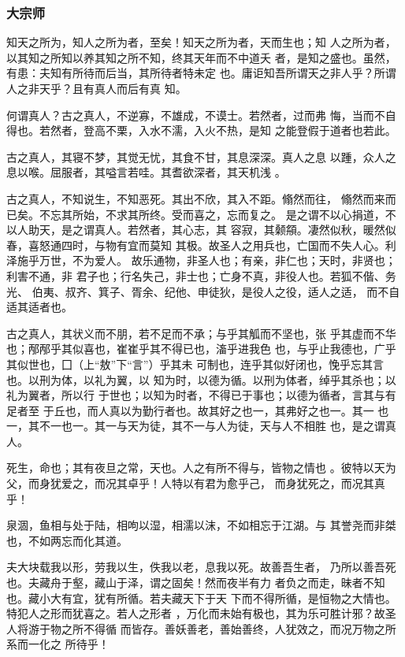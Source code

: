 \documentclass[]{article}
\begin{document}
\hypertarget{header-n2049}{%
\subsubsection{大宗师}\label{header-n2049}}

知天之所为，知人之所为者，至矣！知天之所为者，天而生也；知
人之所为者，以其知之所知以养其知之所不知，终其天年而不中道夭
者，是知之盛也。虽然，有患：夫知有所待而后当，其所待者特未定
也。庸讵知吾所谓天之非人乎？所谓人之非天乎？且有真人而后有真 知。

何谓真人？古之真人，不逆寡，不雄成，不谟士。若然者，过而弗
悔，当而不自得也。若然者，登高不栗，入水不濡，入火不热，是知
之能登假于道者也若此。

古之真人，其寝不梦，其觉无忧，其食不甘，其息深深。真人之息
以踵，众人之息以喉。屈服者，其嗌言若哇。其耆欲深者，其天机浅 。

古之真人，不知说生，不知恶死。其出不欣，其入不距。翛然而往，
翛然而来而已矣。不忘其所始，不求其所终。受而喜之，忘而复之。
是之谓不以心捐道，不以人助天，是之谓真人。若然者，其心志，其
容寂，其颡頯。凄然似秋，暖然似春，喜怒通四时，与物有宜而莫知
其极。故圣人之用兵也，亡国而不失人心。利泽施乎万世，不为爱人。
故乐通物，非圣人也；有亲，非仁也；天时，非贤也；利害不通，非
君子也；行名失己，非士也；亡身不真，非役人也。若狐不偕、务光、
伯夷、叔齐、箕子、胥余、纪他、申徒狄，是役人之役，适人之适，
而不自适其适者也。

古之真人，其状义而不朋，若不足而不承；与乎其觚而不坚也，张
乎其虚而不华也；邴邴乎其似喜也，崔崔乎其不得已也，滀乎进我色
也，与乎止我德也，广乎其似世也，囗（上``敖''下``言''）乎其未
可制也，连乎其似好闭也，悗乎忘其言也。以刑为体，以礼为翼，以
知为时，以德为循。以刑为体者，绰乎其杀也；以礼为翼者，所以行
于世也；以知为时者，不得已于事也；以德为循者，言其与有足者至
于丘也，而人真以为勤行者也。故其好之也一，其弗好之也一。其一
也一，其不一也一。其一与天为徒，其不一与人为徒，天与人不相胜
也，是之谓真人。

死生，命也；其有夜旦之常，天也。人之有所不得与，皆物之情也
。彼特以天为父，而身犹爱之，而况其卓乎！人特以有君为愈乎己，
而身犹死之，而况其真乎！

泉涸，鱼相与处于陆，相呴以湿，相濡以沫，不如相忘于江湖。与
其誉尧而非桀也，不如两忘而化其道。

夫大块载我以形，劳我以生，佚我以老，息我以死。故善吾生者，
乃所以善吾死也。夫藏舟于壑，藏山于泽，谓之固矣！然而夜半有力
者负之而走，昧者不知也。藏小大有宜，犹有所循。若夫藏天下于天
下而不得所循，是恒物之大情也。特犯人之形而犹喜之。若人之形者
，万化而未始有极也，其为乐可胜计邪？故圣人将游于物之所不得循
而皆存。善妖善老，善始善终，人犹效之，而况万物之所系而一化之 所待乎！
\end{document}
